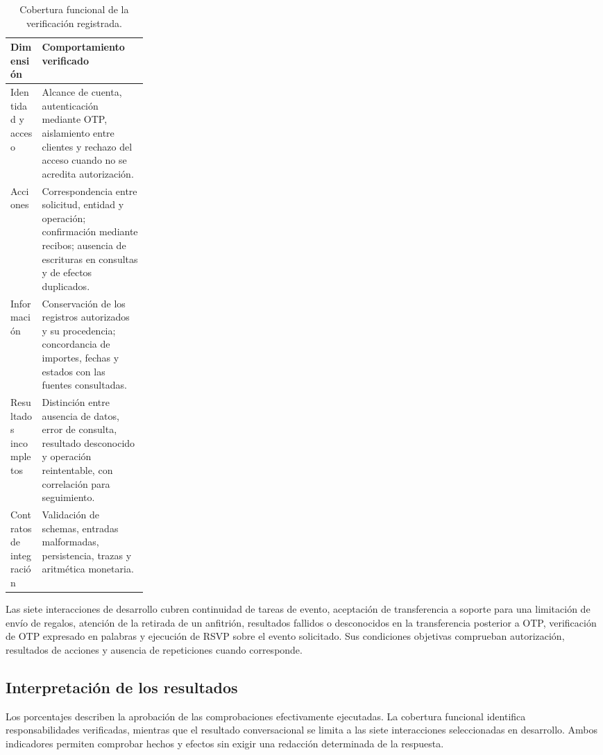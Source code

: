 \documentclass[
	a4paper,
	12pt,
]{CSSullivanBusinessReport}
\begin{document}
\begin{table}[H]
\centering\small
\begin{tabularx}{\linewidth}{@{} L{0.23\linewidth} X @{}}
\toprule
Dimensión & Comportamiento verificado\\\midrule
Identidad y acceso & Alcance de cuenta, autenticación mediante OTP, aislamiento entre clientes y rechazo del acceso cuando no se acredita autorización.\\
Acciones & Correspondencia entre solicitud, entidad y operación; confirmación mediante recibos; ausencia de escrituras en consultas y de efectos duplicados.\\
Información & Conservación de los registros autorizados y su procedencia; concordancia de importes, fechas y estados con las fuentes consultadas.\\
Resultados incompletos & Distinción entre ausencia de datos, error de consulta, resultado desconocido y operación reintentable, con correlación para seguimiento.\\
Contratos de integración & Validación de schemas, entradas malformadas, persistencia, trazas y aritmética monetaria.\\
\bottomrule
\end{tabularx}
\caption{Cobertura funcional de la verificación registrada.}\label{tab:functional-coverage}
\end{table}

Las siete interacciones de desarrollo cubren continuidad de tareas de evento, aceptación de transferencia a soporte para una limitación de envío de regalos, atención de la retirada de un anfitrión, resultados fallidos o desconocidos en la transferencia posterior a OTP, verificación de OTP expresado en palabras y ejecución de RSVP sobre el evento solicitado. Sus condiciones objetivas comprueban autorización, resultados de acciones y ausencia de repeticiones cuando corresponde.

\subsection{Interpretación de los resultados}
Los porcentajes describen la aprobación de las comprobaciones efectivamente ejecutadas. La cobertura funcional identifica responsabilidades verificadas, mientras que el resultado conversacional se limita a las siete interacciones seleccionadas en desarrollo. Ambos indicadores permiten comprobar hechos y efectos sin exigir una redacción determinada de la respuesta.
\end{document}
